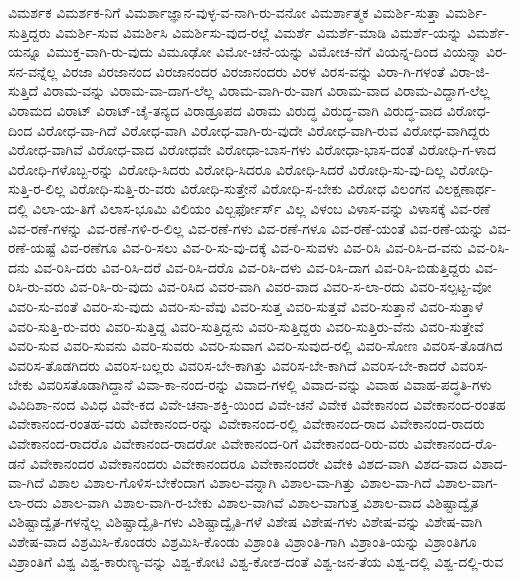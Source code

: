 {ವಿಮರ್ಶಕ
ವಿಮರ್ಶಕ-ನಿಗೆ
ವಿಮರ್ಶಾಜ್ಞಾನ-ವುಳ್ಳ-ವ-ನಾಗಿ-ರು-ವನೋ
ವಿಮರ್ಶಾತ್ಮಕ
ವಿಮರ್ಶಿ-ಸುತ್ತಾ
ವಿಮರ್ಶಿ-ಸುತ್ತಿದ್ದರು
ವಿಮರ್ಶಿ-ಸುವ
ವಿಮರ್ಶಿಸಿ
ವಿಮರ್ಶಿಸು-ವುದ-ರಲ್ಲೆ
ವಿಮರ್ಶೆ
ವಿಮರ್ಶೆ-ಮಾಡಿ
ವಿಮರ್ಶೆ-ಯನ್ನು
ವಿಮರ್ಶೆ-ಯನ್ನೂ
ವಿಮುಕ್ತ-ವಾಗಿ-ರು-ವುದು
ವಿಮೂಢೋ
ವಿಮೋ-ಚನೆ-ಯನ್ನು
ವಿಮೋಚ-ನೆಗೆ
ವಿಯನ್ನ-ದಿಂದ
ವಿಯನ್ನಾ
ವಿರ-ಸನ-ವನ್ನೆಲ್ಲ
ವಿರಜಾ
ವಿರಜಾನಂದ
ವಿರಜಾನಂದರ
ವಿರಜಾನಂದರು
ವಿರಳ
ವಿರಸ-ವನ್ನು
ವಿರಾ-ಗಿ-ಗಳಂತೆ
ವಿರಾ-ಜಿ-ಸುತ್ತಿದೆ
ವಿರಾಮ-ವನ್ನು
ವಿರಾಮ-ವಾ-ದಾಗ-ಲೆಲ್ಲ
ವಿರಾಮ-ವಾಗಿ-ರು-ವಾಗ
ವಿರಾಮ-ವಾದ
ವಿರಾಮ-ವಿದ್ದಾಗ-ಲೆಲ್ಲ
ವಿರಾಮದ
ವಿರಾಟ್
ವಿರಾಟ್-ಚೈ-ತನ್ಯದ
ವಿರಾಡ್ರೂಪದ
ವಿರಾಮ
ವಿರುದ್ಧ
ವಿರುದ್ಧ-ವಾಗಿ
ವಿರುದ್ಧ-ವಾದ
ವಿರೋಧ-ದಿಂದ
ವಿರೋಧ-ವಾ-ಗಿದೆ
ವಿರೋಧ-ವಾಗಿ
ವಿರೋಧ-ವಾಗಿ-ರು-ವುದೇ
ವಿರೋಧ-ವಾಗಿ-ರುವ
ವಿರೋಧ-ವಾಗಿದ್ದರು
ವಿರೋಧ-ವಾಗಿವೆ
ವಿರೋಧ-ವಾದ
ವಿರೋಧವೇ
ವಿರೋಧಾ-ಬಾಸ-ಗಳು
ವಿರೋಧಾ-ಭಾಸ-ದಂತೆ
ವಿರೋಧಿ-ಗ-ಳಾದ
ವಿರೋಧಿ-ಗಳೊಬ್ಬ-ರನ್ನು
ವಿರೋಧಿ-ಸಿದರು
ವಿರೋಧಿ-ಸಿದರೂ
ವಿರೋಧಿ-ಸಿದರೆ
ವಿರೋಧಿ-ಸು-ವು-ದಿಲ್ಲ
ವಿರೋಧಿ-ಸುತ್ತಿ-ರ-ಲಿಲ್ಲ
ವಿರೋಧಿ-ಸುತ್ತಿ-ರು-ವರು
ವಿರೋಧಿ-ಸುತ್ತೇನೆ
ವಿರೋಧಿ-ಸ-ಬೇಕು
ವಿರೋಧ
ವಿಲಂಗನ
ವಿಲಕ್ಷಣಾರ್ಥ-ದಲ್ಲಿ
ವಿಲಾ-ಯ-ತಿಗೆ
ವಿಲಾಸ-ಭೂಮಿ
ವಿಲಿಯಂ
ವಿಲ್ಬರ್ಫೋರ್ಸ್
ವಿಲ್ಲ
ವಿಳಂಬ
ವಿಳಾಸ-ವನ್ನು
ವಿಳಾಸಕ್ಕೆ
ವಿವ-ರಣೆ
ವಿವ-ರಣೆ-ಗಳನ್ನು
ವಿವ-ರಣೆ-ಗಳಿ-ರ-ಲಿಲ್ಲ
ವಿವ-ರಣೆ-ಗಳು
ವಿವ-ರಣೆ-ಗಳೂ
ವಿವ-ರಣೆ-ಯಂತೆ
ವಿವ-ರಣೆ-ಯನ್ನು
ವಿವ-ರಣೆ-ಯಷ್ಟೆ
ವಿವ-ರಣೆಗೂ
ವಿವ-ರಿ-ಸಲು
ವಿವ-ರಿ-ಸು-ವು-ದಕ್ಕೆ
ವಿವ-ರಿ-ಸುವಳು
ವಿವ-ರಿಸಿ
ವಿವ-ರಿಸಿ-ದ-ವನು
ವಿವ-ರಿಸಿ-ದನು
ವಿವ-ರಿಸಿ-ದರು
ವಿವ-ರಿಸಿ-ದರೆ
ವಿವ-ರಿಸಿ-ದರೊ
ವಿವ-ರಿಸಿ-ದಳು
ವಿವ-ರಿಸಿ-ದಾಗ
ವಿವ-ರಿಸಿ-ಬಿಡುತ್ತಿದ್ದರು
ವಿವ-ರಿಸಿ-ರು-ವರು
ವಿವ-ರಿಸಿ-ರು-ವುದು
ವಿವ-ರಿಸಿದ
ವಿವರ-ವಾಗಿ
ವಿವರ-ವಾದ
ವಿವರಿ-ಸ-ಲಾ-ರದು
ವಿವರಿ-ಸಲ್ಪಟ್ಟ-ವೋ
ವಿವರಿ-ಸು-ವಂತೆ
ವಿವರಿ-ಸು-ವುದು
ವಿವರಿ-ಸು-ವೆವು
ವಿವರಿ-ಸುತ್ತ
ವಿವರಿ-ಸುತ್ತವೆ
ವಿವರಿ-ಸುತ್ತಾನೆ
ವಿವರಿ-ಸುತ್ತಾಳೆ
ವಿವರಿ-ಸುತ್ತಿ-ರು-ವರು
ವಿವರಿ-ಸುತ್ತಿದ್ದ
ವಿವರಿ-ಸುತ್ತಿದ್ದನು
ವಿವರಿ-ಸುತ್ತಿದ್ದರು
ವಿವರಿ-ಸುತ್ತಿರು-ವೆನು
ವಿವರಿ-ಸುತ್ತೇವೆ
ವಿವರಿ-ಸುವ
ವಿವರಿ-ಸುವನು
ವಿವರಿ-ಸುವರು
ವಿವರಿ-ಸುವಾಗ
ವಿವರಿ-ಸುವುದ-ರಲ್ಲಿ
ವಿವರಿ-ಸೋಣ
ವಿವರಿಸ-ತೊಡಗಿದ
ವಿವರಿಸ-ತೊಡಗಿದರು
ವಿವರಿಸ-ಬಲ್ಲರು
ವಿವರಿಸ-ಬೇ-ಕಾಗಿತ್ತು
ವಿವರಿಸ-ಬೇ-ಕಾಗಿದೆ
ವಿವರಿಸ-ಬೇ-ಕಾದರೆ
ವಿವರಿಸ-ಬೇಕು
ವಿವರಿಸತೊಡಾಗಿದ್ದಾನೆ
ವಿವಾ-ಕಾ-ನಂದ-ರನ್ನು
ವಿವಾದ-ಗಳಲ್ಲಿ
ವಿವಾದ-ವನ್ನು
ವಿವಾಹ
ವಿವಾಹ-ಪದ್ಧತಿ-ಗಳು
ವಿವಿದಿಶಾ-ನಂದ
ವಿವಿಧ
ವಿವೇ-ಕದ
ವಿವೇ-ಚನಾ-ಶಕ್ತಿ-ಯಿಂದ
ವಿವೇ-ಚನೆ
ವಿವೇಕ
ವಿವೇಕಾನಂದ
ವಿವೇಕಾನಂದ-ರಂತಹ
ವಿವೇಕಾನಂದ-ರಂತಹ-ವರು
ವಿವೇಕಾನಂದ-ರನ್ನು
ವಿವೇಕಾನಂದ-ರಲ್ಲಿ
ವಿವೇಕಾನಂದ-ರಾದ
ವಿವೇಕಾನಂದ-ರಾದರು
ವಿವೇಕಾನಂದ-ರಾದರೊ
ವಿವೇಕಾನಂದ-ರಾದರೋ
ವಿವೇಕಾನಂದ-ರಿಗೆ
ವಿವೇಕಾನಂದ-ರಿರು-ವರು
ವಿವೇಕಾನಂದ-ರೊ-ಡನೆ
ವಿವೇಕಾನಂದರ
ವಿವೇಕಾನಂದರು
ವಿವೇಕಾನಂದರೂ
ವಿವೇಕಾನಂದರೇ
ವಿವೇಕಿ
ವಿಶದ-ವಾಗಿ
ವಿಶದ-ವಾದ
ವಿಶಾದ-ವಾ-ಗಿದೆ
ವಿಶಾಲ
ವಿಶಾಲ-ಗೊಳಿಸ-ಬೇಕೆಂದಾಗ
ವಿಶಾಲ-ವನ್ನಾಗಿ
ವಿಶಾಲ-ವಾ-ಗಿತ್ತು
ವಿಶಾಲ-ವಾ-ಗಿದೆ
ವಿಶಾಲ-ವಾಗ-ಲಾ-ರದು
ವಿಶಾಲ-ವಾಗಿ
ವಿಶಾಲ-ವಾಗಿ-ರ-ಬೇಕು
ವಿಶಾಲ-ವಾಗಿವೆ
ವಿಶಾಲ-ವಾಗುತ್ತ
ವಿಶಾಲ-ವಾದ
ವಿಶಿಷ್ಟಾದ್ವೈತ
ವಿಶಿಷ್ಟಾದ್ವೈತ-ಗಳನ್ನೆಲ್ಲ
ವಿಶಿಷ್ಟಾದ್ವೈತಿ-ಗಳು
ವಿಶಿಷ್ಟಾದ್ವೈತಿ-ಗಳೆ
ವಿಶೇಷ
ವಿಶೇಷ-ಗಳು
ವಿಶೇಷ-ವನ್ನು
ವಿಶೇಷ-ವಾಗಿ
ವಿಶೇಷ-ವಾದ
ವಿಶ್ರಮಿಸಿ-ಕೊಂಡರು
ವಿಶ್ರಮಿಸಿ-ಕೊಂಡು
ವಿಶ್ರಾಂತಿ
ವಿಶ್ರಾಂತಿ-ಗಾಗಿ
ವಿಶ್ರಾಂತಿ-ಯನ್ನು
ವಿಶ್ರಾಂತಿಗೂ
ವಿಶ್ರಾಂತಿಗೆ
ವಿಶ್ವ
ವಿಶ್ವ-ಕಾರುಣ್ಯ-ವನ್ನು
ವಿಶ್ವ-ಕೋಟಿ
ವಿಶ್ವ-ಕೋಶ-ದಂತೆ
ವಿಶ್ವ-ಜನ-ತೆಯ
ವಿಶ್ವ-ದಲ್ಲಿ
ವಿಶ್ವ-ದಲ್ಲಿ-ರುವ
}
